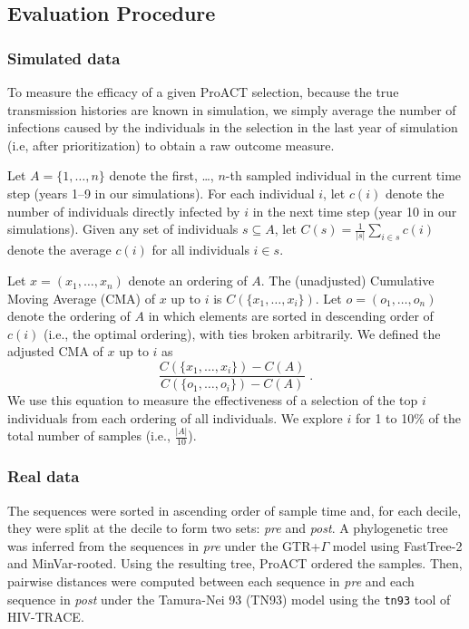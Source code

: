 \documentclass[a4paper,11pt]{article}
\begin{document}
\subsection{Evaluation Procedure}

\subsubsection{Simulated data}
To measure the efficacy of a given ProACT selection,
because the true transmission histories are known in simulation,
we simply average the number of infections caused by the individuals in the selection in the last year of simulation (i.e, after prioritization)
to obtain a raw outcome measure.

Let $A=\{1,\ldots,n\}$ denote the first, \ldots, $n$-th sampled individual in the current time step (years 1--9 in our simulations). For each individual $i$, let $c(i)$ denote the number of individuals directly infected by $i$ in the next time step (year 10 in our simulations). 
Given any set of individuals $s\subseteq A$, let $C(s)=\frac{1}{|s|}\sum_{i\in s}{c(i)}$ denote the average $c(i)$ for all individuals $i\in s$.

Let $x=(x_1,\ldots,x_n)$ denote an ordering of $A$. The (unadjusted) Cumulative Moving Average (CMA) of $x$ up to $i$ is $C\left(\{x_1,\ldots,x_i\}\right)$.
Let $o=(o_1,\ldots,o_n)$ denote the ordering of $A$ in which elements are sorted in descending order of $c(i)$ (i.e., the optimal ordering), with ties broken arbitrarily. 
We defined the adjusted CMA of $x$ up to $i$ as
\begin{equation*}%
    \frac{C\left(\{x_1,\ldots,x_i\}\right)-C(A)}{C\left(\{o_1,\ldots,o_i\}\right)-C(A)}\; .
\end{equation*}
We use this equation to measure the effectiveness of a selection of the top $i$ individuals from each ordering of all individuals.
We explore $i$ for 1 to 10\% of the total number of samples (i.e., $\frac{|A|}{10}$). 

\subsubsection{Real data}
The sequences were sorted in ascending order of sample time and,
for each decile,
they were split at the decile to form two sets: \textit{pre} and \textit{post}. A phylogenetic tree was inferred from the sequences in \textit{pre} under the GTR+$\Gamma$ model using FastTree-2 \supercite{Price2010} and MinVar-rooted.\supercite{Mai2017}
Using the resulting tree, ProACT ordered the samples. 
Then, pairwise distances were computed between each sequence in \textit{pre} and each sequence in \textit{post} under the Tamura-Nei 93 (TN93) model \supercite{Tamura1993} using the \texttt{tn93} tool of HIV-TRACE.\supercite{Pond2018}
\end{document}
